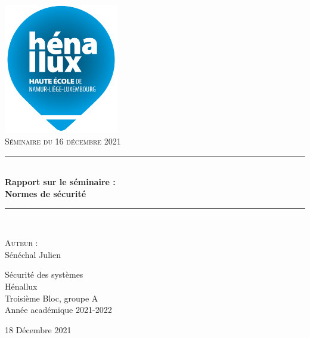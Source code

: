 \documentclass[a4paper]{article}
\newcommand{\HRule}{\rule{\linewidth}{0.5mm}}
\begin{document}
\begin{titlepage}
  \begin{sffamily}
  \begin{center}
    \includegraphics[width=5cm]{images/LogoHenallux.PNG}~\\[1.5cm]
    \textsc{\Large Séminaire du 16 décembre 2021}\\[1.5cm]
    \HRule \\[0.4cm]
    { \huge \bfseries Rapport sur le séminaire :\\ Normes de sécurité\\[0.4cm] }
    \HRule \\[2cm]
    \begin{minipage}{0.4\textwidth}
      \begin{flushleft} \large
        \textsc{Auteur} :\\
        Sénéchal Julien\\
        

      \end{flushleft}
    \end{minipage}
    \begin{minipage}{0.55\textwidth}
      \begin{flushright} \large
		Sécurité des systèmes\\
		Hénallux\\
		Troisième Bloc, groupe A \\
		Année académique 2021-2022\\
      \end{flushright}
    \end{minipage}
    \vfill
    {\large 18 Décembre 2021}
  \end{center}
  \end{sffamily}
\end{titlepage}
\end{document}

